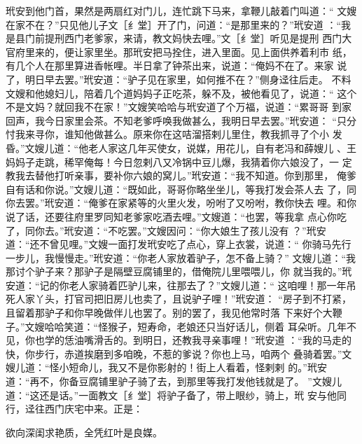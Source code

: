 玳安到他门首，果然是两扇红对门儿，连忙跳下马来，拿鞭儿敲着门叫道：“
文嫂在家不在？”只见他儿子文［纟堂］开了门，问道：“是那里来的？”玳安道
：“我是县门前提刑西门老爹家，来请，教文妈快去哩。”文［纟堂］听见是提刑
西门大官府里来的，便让家里坐。那玳安把马拴住，进入里面。见上面供养着利市
纸，有几个人在那里算进香帐哩。半日拿了钟茶出来，说道：“俺妈不在了。来家
说了，明日早去罢。”玳安道：“驴子见在家里，如何推不在？”侧身迳往后走。
不料文嫂和他媳妇儿，陪着几个道妈妈子正吃茶，躲不及，被他看见了，说道：“
这个不是文妈？就回我不在家！”文嫂笑哈哈与玳安道了个万福，说道：“累哥哥
到家回声，我今日家里会茶。不知老爹呼唤我做甚么，我明日早去罢。”玳安道：
“只分忖我来寻你，谁知他做甚么。原来你在这咭溜搭剌儿里住，教我抓寻了个小
发昏。”文嫂儿道：“他老人家这几年买使女，说媒，用花儿，自有老冯和薛嫂儿
、王妈妈子走跳，稀罕俺每！今日忽剌八又冷锅中豆儿爆，我猜着你六娘没了，一
定教我去替他打听亲事，要补你六娘的窝儿。”玳安道：“我不知道。你到那里，
俺爹自有话和你说。”文嫂儿道：“既如此，哥哥你略坐坐儿，等我打发会茶人去
了，同你去罢。”玳安道：“俺爹在家紧等的火里火发，吩咐了又吩咐，教你快去
哩。和你说了话，还要往府里罗同知老爹家吃酒去哩。”文嫂道：“也罢，等我拿
点心你吃了，同你去。”玳安道：“不吃罢。”文嫂因问：“你大娘生了孩儿没有
？”玳安道：“还不曾见哩。”文嫂一面打发玳安吃了点心，穿上衣裳，说道：“
你骑马先行一步儿，我慢慢走。”玳安道：“你老人家放着驴子，怎不备上骑？”
文嫂儿道：“我那讨个驴子来？那驴子是隔壁豆腐铺里的，借俺院儿里喂喂儿，你
就当我的。”玳安道：“记的你老人家骑着匹驴儿来，往那去了？”文嫂儿道：“
这咱哩！那一年吊死人家丫头，打官司把旧房儿也卖了，且说驴子哩！”玳安道：
“房子到不打紧，且留着那驴子和你早晚做伴儿也罢了。别的罢了，我见他常时落
下来好个大鞭子。”文嫂哈哈笑道：“怪猴子，短寿命，老娘还只当好话儿，侧着
耳朵听。几年不见，你也学的恁油嘴滑舌的。到明日，还教我寻亲事哩！”玳安道
：“我的马走的快，你步行，赤道挨磨到多咱晚，不惹的爹说？你也上马，咱两个
叠骑着罢。”文嫂儿道：“怪小短命儿，我又不是你影射的！街上人看着，怪剌剌
的。”玳安道：“再不，你备豆腐铺里驴子骑了去，到那里等我打发他钱就是了。
”文嫂儿道：“这还是话。”一面教文［纟堂］将驴子备了，带上眼纱，骑上，玳
安与他同行，迳往西门庆宅中来。正是：

欲向深闺求艳质，全凭红叶是良媒。